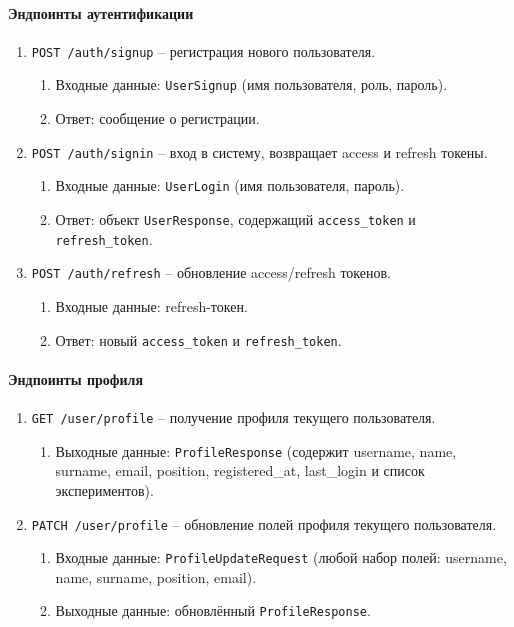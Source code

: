\paragraph{Эндпоинты аутентификации}

\begin{enumerate}
\item \texttt{POST /auth/signup} -- регистрация нового пользователя.
\begin{enumerate}[label=\arabic{enumi}.\arabic*.]
\item Входные данные: \texttt{UserSignup} (имя пользователя, роль, пароль).
\item Ответ: сообщение о регистрации.
\end{enumerate}

\item \texttt{POST /auth/signin} -- вход в систему, возвращает access и refresh токены.
\begin{enumerate}[label=\arabic{enumi}.\arabic*.]
\item Входные данные: \texttt{UserLogin} (имя пользователя, пароль).
\item Ответ: объект \texttt{UserResponse}, содержащий \texttt{access\_token} и \texttt{refresh\_token}.
\end{enumerate}

\item \texttt{POST /auth/refresh} -- обновление access/refresh токенов.
\begin{enumerate}[label=\arabic{enumi}.\arabic*.]
\item Входные данные: refresh-токен.
\item Ответ: новый \texttt{access\_token} и \texttt{refresh\_token}.
\end{enumerate}
\end{enumerate}

\paragraph{Эндпоинты профиля}

\begin{enumerate}
\item \texttt{GET /user/profile} -- получение профиля текущего пользователя.
\begin{enumerate}[label=\arabic{enumi}.\arabic*.]
\item Выходные данные: \texttt{ProfileResponse} (содержит username, name, surname, email, position, registered\_at, last\_login и список экспериментов).
\end{enumerate}
\item \texttt{PATCH /user/profile} -- обновление полей профиля текущего пользователя.
\begin{enumerate}[label=\arabic{enumi}.\arabic*.]
\item Входные данные: \texttt{ProfileUpdateRequest} (любой набор полей: username, name, surname, position, email).
\item Выходные данные: обновлённый \texttt{ProfileResponse}.
\end{enumerate}
\end{enumerate}

